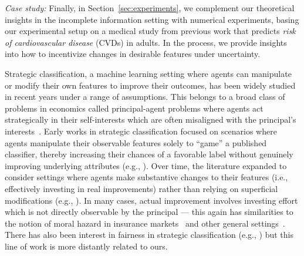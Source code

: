 \emph{Case study:} Finally, in Section~\ref{sec:experiments}, we complement our theoretical insights in the incomplete information setting with numerical experiments, basing our experimental setup on a medical study from previous work that predicts \emph{risk of cardiovascular disease} (CVDs) in adults. In the process, we provide insights into how to incentivize changes in desirable features under uncertainty.



\vspace{5pt}
Strategic classification, a machine learning setting where agents can manipulate or modify their own features to improve their outcomes, has been widely studied in recent years under a range of assumptions. This belongs to a broad class of problems in economics called principal-agent problems where agents act strategically in their self-interests which are often misaligned with the principal's interests~\cite{grossman1992analysis,ross1973economic,laffont2009theory,sappington1991incentives}. Early works in strategic classification focused on scenarios where agents manipulate their observable features solely to ``game'' a published classifier, thereby increasing their chances of a favorable label without genuinely improving underlying attributes (e.g., \cite{hardt2016strategic, braverman_randomness, dong2017strategicclassificationrevealedpreferences,zhang2022fairness,lechner2023strategic,chen2020learning,ahmadi2021strategic,sundaram2023pac}). Over time, the literature expanded to consider settings where agents make substantive changes to their features (i.e., effectively investing in real improvements) rather than relying on superficial modifications (e.g., \cite{kleinberg2019classifiers,bechavod2022information,bechavod2022gaming,shavit2020incentives,harris2021stateful}). In many cases, actual improvement involves investing effort which is not directly observable by the principal --- this again has similarities to the notion of moral hazard in insurance markets~\cite{pauly1968economics,arrow1968economics} and other general settings~\cite{arrow1978uncertainty}. There has also been interest in fairness in strategic classification (e.g., \cite{milli2019social,hu2019disparate,estornell2023group}) but this line of work is more distantly related to ours.

